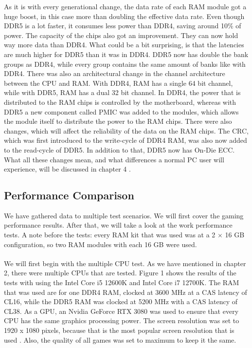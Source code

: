 As it is with every generational change, the data rate of each RAM module got a huge boost, in this case more than doubling the effective data rate. Even though DDR5 is a lot faster, it consumes less power than DDR4, saving around 10\% of power. The capacity of the chips also got an improvement. They can now hold way more data than DDR4. What could be a bit surprising, is that the latencies are much higher for DDR5 than it was in DDR4. DDR5 now has double the bank groups as DDR4, while every group contains the same amount of banks like with DDR4. There was also an architectural change in the channel architecture between the CPU and RAM. With DDR4, RAM has a single 64 bit channel, while with DDR5, RAM has a dual 32 bit channel. In DDR4, the power that is distributed to the RAM chips is controlled by the motherboard, whereas with DDR5 a new component called \gls{PMIC} was added to the modules, which allows the module itself to distribute the power to the RAM chips. There were also changes, which will affect the reliability of the data on the RAM chips. The CRC, which was first introduced to the write-cycle of DDR4 RAM, was also now added to the read-cycle of DDR5. In addition to that, DDR5 now has On-Die ECC. What all these changes mean, and what differences a normal PC user will experience, will be discussed in chapter 4 \parencite{DDR4_DDR5_research, DDR4_DDR5_micron, RAM_latency_data, DDR4_DDR5_CAS, ddr5_overview_kingston}.

\subsection{Performance Comparison}

We have gathered data to multiple test scenarios. We will first cover the gaming performance results. After that, we will take a look at the work performance tests. A note before the tests: every RAM kit that was used was at a 2 × 16 GB configuration, so two RAM modules with each 16 GB were used.
\\
\\
We will first begin with the multiple CPU test. As we have mentioned in chapter 2, there were multiple CPUs that are tested. Figure 1 shows the results of the tests with using the Intel Core i5 12600K and Intel Core i7 12700K. The RAM that was used are for one DDR4 RAM, clocked at 3600 \gls{MHz} at a CAS latency of CL16, while the DDR5 RAM was clocked at 5200 MHz with a CAS latency of CL38. As a GPU, an Nvidia GeForce RTX 3080 was used to ensure that every CPU has the same graphics processing power. The screen resolution was set to 1920 x 1080 pixels, because that is the most popular screen resolution that is used \parencite{most_popular_screenresolution}. Also, the quality of all games was set to maximum to keep it the same.


